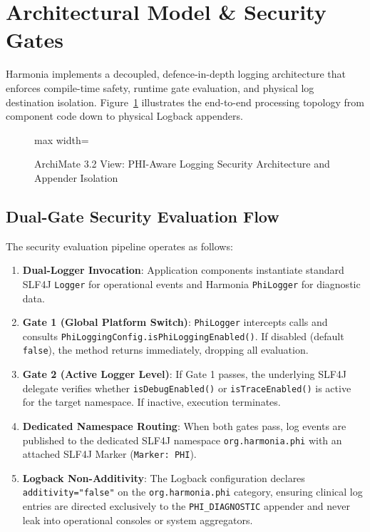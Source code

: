\section{Architectural Model \& Security Gates}
\label{sec:phi_arch_model}

Harmonia implements a decoupled, defence-in-depth logging architecture that enforces compile-time safety, runtime gate evaluation, and physical log destination isolation. Figure~\ref{fig:phi_logging_architecture} illustrates the end-to-end processing topology from component code down to physical Logback appenders.

\begin{figure}[htbp]
    \centering
    \begin{adjustbox}{max width=\textwidth}
        
    \end{adjustbox}
    \caption{ArchiMate 3.2 View: PHI-Aware Logging Security Architecture and Appender Isolation}
    \label{fig:phi_logging_architecture}
\end{figure}

\subsection{Dual-Gate Security Evaluation Flow}

The security evaluation pipeline operates as follows:
\begin{enumerate}
    \item \textbf{Dual-Logger Invocation}: Application components instantiate standard SLF4J \texttt{Logger} for operational events and Harmonia \texttt{PhiLogger} for diagnostic data.
    \item \textbf{Gate 1 (Global Platform Switch)}: \texttt{PhiLogger} intercepts calls and consults \texttt{PhiLoggingConfig.isPhiLoggingEnabled()}. If disabled (default \texttt{false}), the method returns immediately, dropping all evaluation.
    \item \textbf{Gate 2 (Active Logger Level)}: If Gate 1 passes, the underlying SLF4J delegate verifies whether \texttt{isDebugEnabled()} or \texttt{isTraceEnabled()} is active for the target namespace. If inactive, execution terminates.
    \item \textbf{Dedicated Namespace Routing}: When both gates pass, log events are published to the dedicated SLF4J namespace \texttt{org.harmonia.phi} with an attached SLF4J Marker (\texttt{Marker: PHI}).
    \item \textbf{Logback Non-Additivity}: The Logback configuration declares \texttt{additivity="false"} on the \texttt{org.harmonia.phi} category, ensuring clinical log entries are directed exclusively to the \texttt{PHI\_DIAGNOSTIC} appender and never leak into operational consoles or system aggregators.
\end{enumerate}

